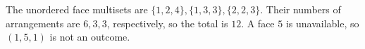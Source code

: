 The unordered face multisets are $\{1,2,4\},\{1,3,3\},\{2,2,3\}$. Their numbers of arrangements are $6,3,3$, respectively, so the total is $\boxed{12}$. A face $5$ is unavailable, so $(1,5,1)$ is not an outcome.
